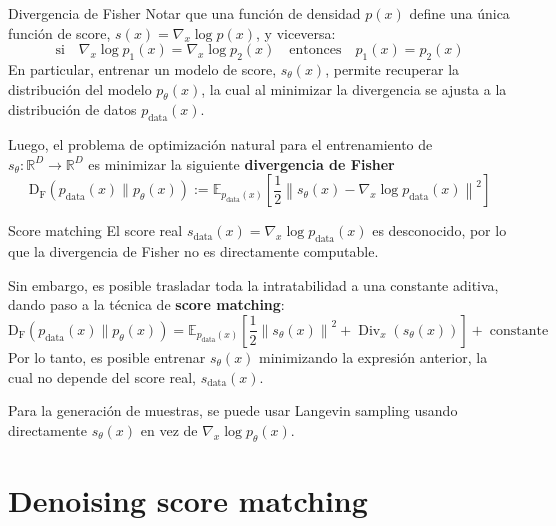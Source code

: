 \documentclass{beamer}
\newcommand{\R}{\mathbb{R}}
\begin{document}
\begin{frame}{Divergencia de Fisher}
    Notar que una función de densidad $p(x)$ define una única función de score, $s(x)=\nabla_x\log p(x)$, y viceversa:
    \begin{equation*}
        \text{si}\quad
        \nabla_x \log p_1(x)=\nabla_x \log p_2(x)
        \quad\text{entonces}\quad
        p_1(x)=p_2(x)
    \end{equation*}
    En particular, entrenar un modelo de score, $s_\theta(x)$, permite recuperar la distribución del modelo $p_\theta(x)$, la cual al minimizar la divergencia se ajusta a la distribución de datos $p_{\text{data}}(x)$.

    Luego, el problema de optimización natural para el entrenamiento de $s_\theta:\R^D\to\R^D$ es minimizar la siguiente \textbf{divergencia de Fisher}
    \begin{equation*}
        \operatorname{D_F}\left(p_{\text{data}}(x)\|p_\theta(x)\right):= \mathbb{E}_{p_{\text{data}}(x)}\left[\frac{1}{2}\left\|s_\theta(x)-\nabla_x\log p_{\text{data}}(x)\right\|^2\right]
    \end{equation*}
\end{frame}

\begin{frame}{Score matching}
    El score real $s_{\text{data}}(x)=\nabla_x\log p_{\text{data}}(x)$ es desconocido, por lo que la divergencia de Fisher no es directamente computable.

    Sin embargo, es posible trasladar toda la intratabilidad a una constante aditiva, dando paso a la técnica de \textbf{score matching}:
    \begin{equation*}
        \operatorname{D_F}\left(p_{\text{data}}(x)\|p_\theta(x)\right)= \mathbb{E}_{p_{\text{data}}(x)}\left[\frac{1}{2}\left\|s_\theta(x)\right\|^2 + \operatorname{Div}_x\left( s_\theta(x)\right)\right] + \operatorname{constante}
    \end{equation*}
    Por lo tanto, es posible entrenar $s_\theta(x)$ minimizando la expresión anterior, la cual no depende del score real, $s_{\text{data}}(x)$.

    Para la generación de muestras, se puede usar Langevin sampling usando directamente $s_\theta(x)$ en vez de $\nabla_x\log p_\theta(x)$.
\end{frame}

\section{Denoising score matching}
\end{document}
